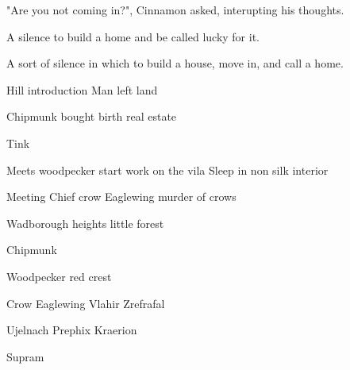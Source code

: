 \documentclass[smalldemyvopaper,11pt,twoside,onecolumn,openright,extrafontsizes]{memoir}
\begin{document}
"Are you not coming in?", Cinnamon asked, interupting his thoughts. 

A silence to build a home and be called lucky for it.

A sort of silence in which to build a house, move in, and call a home. 


\newpage

\vspace*{4.3cm}
\begin{localsize}{10}
	\begin{quote}
	\end{quote} 
\end{localsize}
\vspace{1cm}


\newpage
 Hill introduction Man left land

 Chipmunk bought birth real estate
 
 Tink

 Meets woodpecker start work on the vila
 Sleep in non silk interior

Meeting Chief crow Eaglewing murder of crows

Wadborough heights little forest 

Chipmunk 

Woodpecker 
red crest

Crow Eaglewing
Vlahir
Zrefrafal

Ujelnach
Prephix
Kraerion

Supram

\end{document}
